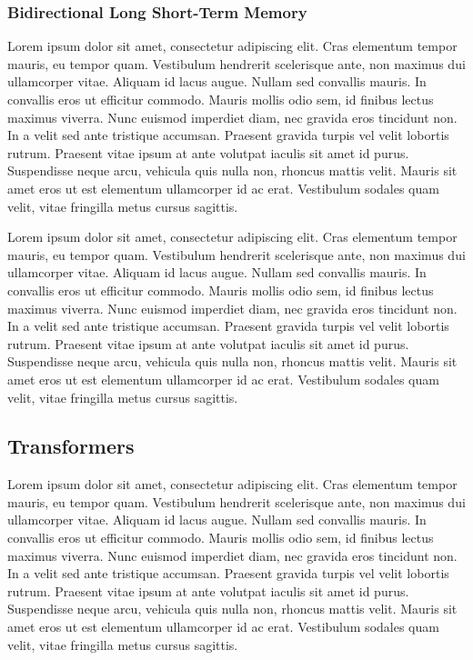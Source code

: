 \documentclass[conference]{IEEEtran}
\begin{document}
\subsubsection{Bidirectional Long Short-Term Memory}

Lorem ipsum dolor sit amet, consectetur adipiscing elit. Cras elementum tempor mauris, eu tempor quam. Vestibulum hendrerit scelerisque ante, non maximus dui ullamcorper vitae. Aliquam id lacus augue. Nullam sed convallis mauris. In convallis eros ut efficitur commodo. Mauris mollis odio sem, id finibus lectus maximus viverra. Nunc euismod imperdiet diam, nec gravida eros tincidunt non. In a velit sed ante tristique accumsan. Praesent gravida turpis vel velit lobortis rutrum. Praesent vitae ipsum at ante volutpat iaculis sit amet id purus. Suspendisse neque arcu, vehicula quis nulla non, rhoncus mattis velit. Mauris sit amet eros ut est elementum ullamcorper id ac erat. Vestibulum sodales quam velit, vitae fringilla metus cursus sagittis.

Lorem ipsum dolor sit amet, consectetur adipiscing elit. Cras elementum tempor mauris, eu tempor quam. Vestibulum hendrerit scelerisque ante, non maximus dui ullamcorper vitae. Aliquam id lacus augue. Nullam sed convallis mauris. In convallis eros ut efficitur commodo. Mauris mollis odio sem, id finibus lectus maximus viverra. Nunc euismod imperdiet diam, nec gravida eros tincidunt non. In a velit sed ante tristique accumsan. Praesent gravida turpis vel velit lobortis rutrum. Praesent vitae ipsum at ante volutpat iaculis sit amet id purus. Suspendisse neque arcu, vehicula quis nulla non, rhoncus mattis velit. Mauris sit amet eros ut est elementum ullamcorper id ac erat. Vestibulum sodales quam velit, vitae fringilla metus cursus sagittis.

\subsection{Transformers}

Lorem ipsum dolor sit amet, consectetur adipiscing elit. Cras elementum tempor mauris, eu tempor quam. Vestibulum hendrerit scelerisque ante, non maximus dui ullamcorper vitae. Aliquam id lacus augue. Nullam sed convallis mauris. In convallis eros ut efficitur commodo. Mauris mollis odio sem, id finibus lectus maximus viverra. Nunc euismod imperdiet diam, nec gravida eros tincidunt non. In a velit sed ante tristique accumsan. Praesent gravida turpis vel velit lobortis rutrum. Praesent vitae ipsum at ante volutpat iaculis sit amet id purus. Suspendisse neque arcu, vehicula quis nulla non, rhoncus mattis velit. Mauris sit amet eros ut est elementum ullamcorper id ac erat. Vestibulum sodales quam velit, vitae fringilla metus cursus sagittis.
\end{document}
